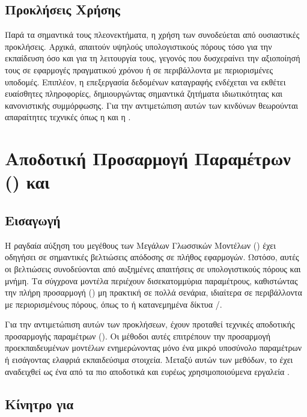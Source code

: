 \subsection{Προκλήσεις Χρήσης }

Παρά τα σημαντικά τους πλεονεκτήματα, η χρήση των  συνοδεύεται από ουσιαστικές προκλήσεις. Αρχικά, απαιτούν υψηλούς υπολογιστικούς πόρους τόσο για την εκπαίδευση όσο και για τη λειτουργία τους, γεγονός που δυσχεραίνει την αξιοποίησή τους σε εφαρμογές πραγματικού χρόνου ή σε περιβάλλοντα με περιορισμένες υποδομές. Επιπλέον, η επεξεργασία δεδομένων καταγραφής ενδέχεται να εκθέτει ευαίσθητες πληροφορίες, δημιουργώντας σημαντικά ζητήματα ιδιωτικότητας και κανονιστικής συμμόρφωσης. Για την αντιμετώπιση αυτών των κινδύνων θεωρούνται απαραίτητες τεχνικές όπως η  και η  \cite{xu2021privacy,pelekis2025adversarial}.

\section{Αποδοτική Προσαρμογή Παραμέτρων () και }

\subsection{Εισαγωγή}

Η ραγδαία αύξηση του μεγέθους των Μεγάλων Γλωσσικών Μοντέλων () έχει οδηγήσει σε σημαντικές βελτιώσεις απόδοσης σε πλήθος εφαρμογών. Ωστόσο, αυτές οι βελτιώσεις συνοδεύονται από αυξημένες απαιτήσεις σε υπολογιστικούς πόρους και μνήμη. Τα σύγχρονα μοντέλα περιέχουν δισεκατομμύρια παραμέτρους, καθιστώντας την πλήρη προσαρμογή () μη πρακτική σε πολλά σενάρια, ιδιαίτερα σε περιβάλλοντα με περιορισμένους πόρους, όπως το  ή κατανεμημένα δίκτυα /.

Για την αντιμετώπιση αυτών των προκλήσεων, έχουν προταθεί τεχνικές αποδοτικής προσαρμογής παραμέτρων (). Οι μέθοδοι αυτές επιτρέπουν την προσαρμογή προεκπαιδευμένων μοντέλων ενημερώνοντας μόνο ένα μικρό υποσύνολο παραμέτρων ή εισάγοντας ελαφριά εκπαιδεύσιμα στοιχεία. Μεταξύ αυτών των μεθόδων, το  έχει αναδειχθεί ως ένα από τα πιο αποδοτικά και ευρέως χρησιμοποιούμενα εργαλεία \cite{hu2021lora}.

\subsection{Κίνητρο για }

